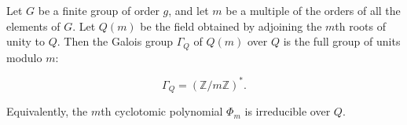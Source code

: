Let $G$ be a finite group of order $g$, and let $m$ be a multiple of the orders of all the elements of $G$. Let $Q(m)$ be the field obtained by adjoining the $m$th roots of unity to $Q$. Then the Galois group $\Gamma_Q$ of $Q(m)$ over $Q$ is the full group of units modulo $m$:

$$\Gamma_Q = (\mathbb{Z}/m\mathbb{Z})^*.$$

Equivalently, the $m$th cyclotomic polynomial $\Phi_m$ is irreducible over $Q$.
